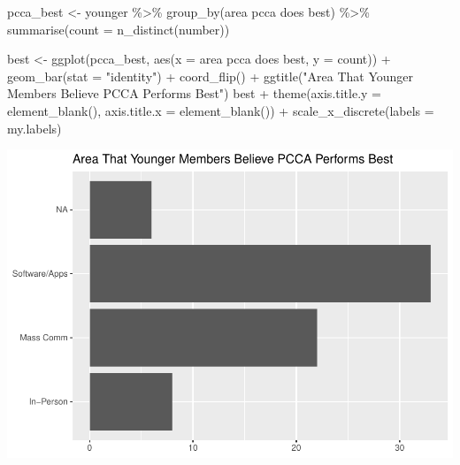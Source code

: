 \documentclass[
]{article}
\newenvironment{Shaded}{\begin{snugshade}}{\end{snugshade}}
\newcommand{\AttributeTok}[1]{\textcolor[rgb]{0.77,0.63,0.00}{#1}}
\newcommand{\FunctionTok}[1]{\textcolor[rgb]{0.00,0.00,0.00}{#1}}
\newcommand{\NormalTok}[1]{#1}
\newcommand{\OtherTok}[1]{\textcolor[rgb]{0.56,0.35,0.01}{#1}}
\newcommand{\SpecialCharTok}[1]{\textcolor[rgb]{0.00,0.00,0.00}{#1}}
\newcommand{\StringTok}[1]{\textcolor[rgb]{0.31,0.60,0.02}{#1}}
\begin{document}
\begin{Shaded}
\begin{Highlighting}[]
\NormalTok{pcca\_best }\OtherTok{\textless{}{-}}\NormalTok{ younger }\SpecialCharTok{\%\textgreater{}\%}
    \FunctionTok{group\_by}\NormalTok{(}\StringTok{\textasciigrave{}}\AttributeTok{area pcca does best}\StringTok{\textasciigrave{}}\NormalTok{) }\SpecialCharTok{\%\textgreater{}\%}
    \FunctionTok{summarise}\NormalTok{(}\AttributeTok{count =} \FunctionTok{n\_distinct}\NormalTok{(number))}

\NormalTok{best }\OtherTok{\textless{}{-}} \FunctionTok{ggplot}\NormalTok{(pcca\_best, }\FunctionTok{aes}\NormalTok{(}\AttributeTok{x =} \StringTok{\textasciigrave{}}\AttributeTok{area pcca does best}\StringTok{\textasciigrave{}}\NormalTok{, }\AttributeTok{y =}\NormalTok{ count)) }\SpecialCharTok{+}
    \FunctionTok{geom\_bar}\NormalTok{(}\AttributeTok{stat =} \StringTok{"identity"}\NormalTok{) }\SpecialCharTok{+} \FunctionTok{coord\_flip}\NormalTok{() }\SpecialCharTok{+} \FunctionTok{ggtitle}\NormalTok{(}\StringTok{"Area That Younger Members Believe PCCA Performs Best"}\NormalTok{)}
\NormalTok{best }\SpecialCharTok{+} \FunctionTok{theme}\NormalTok{(}\AttributeTok{axis.title.y =} \FunctionTok{element\_blank}\NormalTok{(), }\AttributeTok{axis.title.x =} \FunctionTok{element\_blank}\NormalTok{()) }\SpecialCharTok{+}
    \FunctionTok{scale\_x\_discrete}\NormalTok{(}\AttributeTok{labels =}\NormalTok{ my.labels)}
\end{Highlighting}
\end{Shaded}

\includegraphics{pcca_survey_files/figure-latex/best-young-1.pdf}
\end{document}
